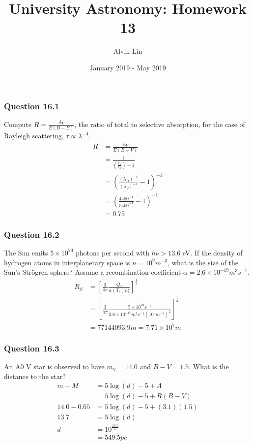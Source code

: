 \documentclass{math}
\title{University Astronomy: Homework 13}
\author{Alvin Lin}
\date{January 2019 - May 2019}
\begin{document}
\maketitle

\subsubsection*{Question 16.1}
Compute \( R = \frac{A_V}{E(B-B)} \), the ratio of total to selective
absorption, for the case of Rayleigh scattering, \( \tau\propto\lambda^{-4} \).
\begin{align*}
  R &= \frac{A_V}{E(B-V)} \\
  &= \frac{1}{(\frac{\tau_B}{\tau_B})-1} \\
  &= \left(\frac{(\lambda_B)^{-4}}{(\lambda_V)^{-4}}-1\right)^{-1} \\
  &= \left(\frac{4450^{-4}}{5500^{-4}}-1\right)^{-1} \\
  &= 0.75
\end{align*}

\subsubsection*{Question 16.2}
The Sun emits \( 5\times10^{23} \) photons per second with \( h\nu > 13.6 \) eV.
If the density of hydrogen atoms in interplanetary space is \( n = 10^{9}m^{-3}
\), what is the size of the Sun's Str\"{o}gren sphere? Assume a recombination
coefficient \( \alpha = 2.6\times10^{-19}m^3s^{-1} \).
\begin{align*}
  R_S &= \left[\frac{3}{4\pi}\frac{Q_*}{\alpha(T_e)n_e^2}\right]^{
    \frac{1}{3}} \\
  &= \left[\frac{3}{4\pi}\frac{5\times10^{23}s^{-1}}
    {2.6\times10^{-19}m^3s^{-1}(10^{9}m^{-3})^2}\right]^{\frac{1}{3}} \\
  &= 77144093.9m = 7.71\times10^{7}m
\end{align*}

\subsubsection*{Question 16.3}
An A0 V star is observed to have \( m_V = 14.0 \) and \( B-V = 1.5 \). What is
the distance to the star?
\begin{align*}
  m-M &= 5\log(d)-5+A \\
  &= 5\log(d)-5+R(B-V) \\
  14.0-0.65 &= 5\log(d)-5+(3.1)(1.5) \\
  13.7 &= 5\log(d) \\
  d &= 10^{\frac{13.7}{5}} \\
  &= 549.5pc
\end{align*}
\end{document}
